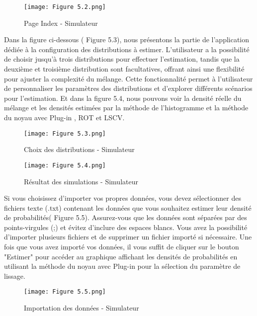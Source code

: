 \begin{figure}[!h]
  \centering
  \texttt{[image: Figure 5.2.png]}
  \caption{Page Index - Simulateur}
  \label{fig:Architecture de l'application}
\end{figure}

Dans la figure ci-dessous ( Figure 5.3), nous présentons la partie de l'application dédiée à la configuration des distributions à estimer. L'utilisateur a la possibilité de choisir jusqu'à trois distributions pour effectuer l'estimation, tandis que la deuxième et troisième distribution sont facultatives, offrant ainsi une flexibilité pour ajuster la complexité du mélange. Cette fonctionnalité permet à l'utilisateur de personnaliser les paramètres des distributions et d'explorer différents scénarios pour l'estimation. Et dans la figure 5.4, nous pouvons voir la densité réelle du mélange et les densités estimées par la méthode de l'histogramme et la méthode du noyau avec Plug-in , ROT et LSCV. 
\clearpage

\begin{figure}[!h]
  \centering
  \texttt{[image: Figure 5.3.png]}
  \caption{Choix des distributions - Simulateur}
  \label{fig:Architecture de l'application}
\end{figure}
\begin{figure}[!h]
  \centering
  \texttt{[image: Figure 5.4.png]}
  \caption{Résultat des simulations - Simulateur}
  \label{fig:Architecture de l'application}
\end{figure}
\clearpage
Si vous choisissez d'importer vos propres données, vous devez sélectionner des fichiers texte (.txt) contenant les données que vous souhaitez estimer leur densité de probabilités( Figure 5.5). Assurez-vous que les données sont séparées par des points-virgules (;) et évitez d'inclure des espaces blancs. Vous avez la possibilité d'importer plusieurs fichiers et de supprimer un fichier importé si nécessaire. Une fois que vous avez importé vos données, il vous suffit de cliquer sur le bouton "Estimer" pour accéder au graphique affichant les densités de probabilités en utilisant la méthode du noyau avec Plug-in pour la sélection du paramètre de lissage.\\
\begin{figure}[!h]
  \centering
  \texttt{[image: Figure 5.5.png]}
  \caption{Importation des données - Simulateur}
  \label{fig:Architecture de l'application}
\end{figure}


